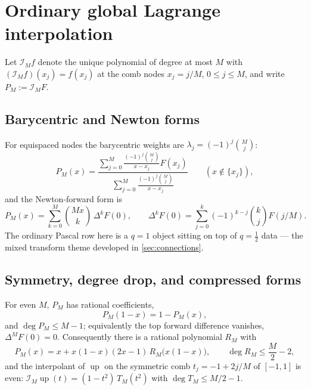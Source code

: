 \documentclass[11pt,oneside]{article}
\numberwithin{equation}{section}
\theoremstyle{definition}
\theoremstyle{remark}
\newcommand{\Up}{\operatorname{up}}
\newcommand{\Lag}{\mathcal I}
\begin{document}
\section{Ordinary global Lagrange interpolation}
\label{sec:ordinary}

Let $\Lag_M f$ denote the unique polynomial of degree at most $M$
with $(\Lag_Mf)(x_j)=f(x_j)$ at the comb nodes $x_j=j/M$,
$0\le j\le M$, and write $P_M:=\Lag_MF$.

\subsection{Barycentric and Newton forms}

For equispaced nodes the barycentric weights are
$\lambda_j=(-1)^{j}\binom Mj$:
\begin{equation}
 P_M(x)=
 \frac{\displaystyle\sum_{j=0}^{M}
 \frac{(-1)^{j}\binom Mj}{x-x_j}F(x_j)}
 {\displaystyle\sum_{j=0}^{M}
 \frac{(-1)^{j}\binom Mj}{x-x_j}}
 \qquad(x\notin\{x_j\}),
 \label{eq:bary-full}
\end{equation}
and the Newton-forward form is
\begin{equation}
 P_M(x)=\sum_{k=0}^{M}\binom{Mx}{k}\,\Delta^{k}F(0),
 \qquad
 \Delta^{k}F(0)=\sum_{j=0}^{k}(-1)^{k-j}\binom kjF(j/M).
 \label{eq:newton-forward}
\end{equation}
The ordinary Pascal row here is a $q=1$ object sitting on top of
$q=\tfrac12$ data --- the mixed transform theme developed in
\cref{sec:connections}.

\subsection{Symmetry, degree drop, and compressed forms}

\begin{proposition}
\label{prop:symmetry}
For even $M$, $P_M$ has rational coefficients,
\begin{equation}
 P_M(1-x)=1-P_M(x),
 \label{eq:P-symmetry}
\end{equation}
and $\deg P_M\le M-1$; equivalently the top forward difference
vanishes, $\Delta^{M}F(0)=0$.  Consequently there is a rational
polynomial $R_M$ with
\begin{equation}
 P_M(x)=x+x(1-x)(2x-1)\,R_M\bigl(x(1-x)\bigr),
 \qquad
 \deg R_M\le\frac M2-2,
 \label{eq:F-compressed}
\end{equation}
and the interpolant of $\Up$ on the symmetric comb
$t_j=-1+2j/M$ of $[-1,1]$ is even:
$\Lag_M\Up(t)=(1-t^{2})\,T_M(t^{2})$ with $\deg T_M\le M/2-1$.
\end{proposition}
\end{document}
